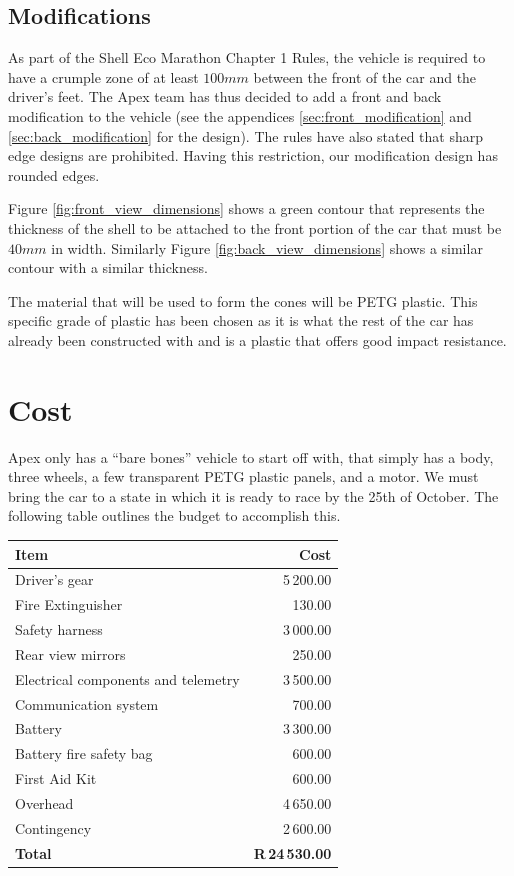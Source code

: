 \documentclass[a4paper, 12pt]{article}
\begin{document}
		\subsection{Modifications}
		\label{sub:modifications}
			As part of the Shell Eco Marathon Chapter 1 Rules, the vehicle is required to have a crumple zone of at least $100mm$ between the front of the car and the driver's feet. The Apex team has thus decided to add a front and back modification to the vehicle (see the appendices \ref{sec:front_modification} and \ref{sec:back_modification} for the design). The rules have also stated that sharp edge designs are prohibited. Having this restriction, our modification design has rounded edges.

			Figure \ref{fig:front_view_dimensions} shows a green contour that represents the thickness of the shell to be attached to the front portion of the car that must be $40mm$ in width. Similarly Figure \ref{fig:back_view_dimensions} shows a similar contour with a similar thickness.

			The material that will be used to form the cones will be PETG plastic. This specific grade of plastic has been chosen as it is what the rest of the car has already been constructed with and is a plastic that offers good impact resistance. 

	\section{Cost} %
	\label{sec:cost}
		Apex only has a ``bare bones'' vehicle to start off with, that simply has a body, three wheels, a few transparent PETG plastic panels, and a motor. We must bring the car to a state in which it is ready to race by the 25th of October. The following table outlines the budget to accomplish this.

		\begin{table}[H]
			\begin{tabularx}{\textwidth}{Xr}
				\toprule
				\textbf{Item} & \textbf{Cost} \\
				\midrule
				Driver's gear & 5\,200.00 \\
				Fire Extinguisher & 130.00 \\
				Safety harness & 3\,000.00 \\
				Rear view mirrors & 250.00 \\
				\addlinespace[0.7em]
				Electrical components and telemetry & 3\,500.00 \\
				Communication system & 700.00 \\
				Battery & 3\,300.00 \\
				Battery fire safety bag & 600.00 \\
				\addlinespace[0.7em]
				First Aid Kit & 600.00 \\
				Overhead & 4\,650.00 \\
				Contingency & 2\,600.00 \\
				\addlinespace[0.3em]
				\midrule
				\textbf{Total} & \textbf{R\,24\,530.00}\\
				\bottomrule
			\end{tabularx}
		\end{table}
\end{document}
